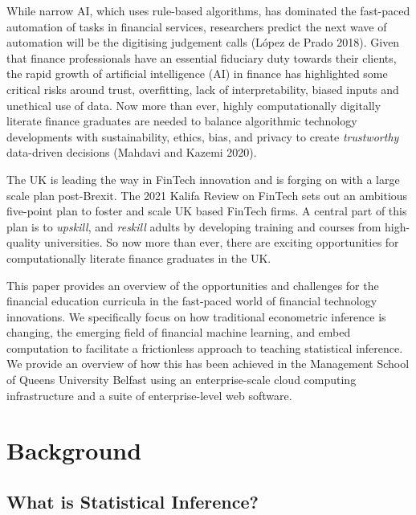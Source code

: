 \documentclass{article}
\begin{document}
While narrow AI, which uses rule-based algorithms, has dominated the
fast-paced automation of tasks in financial services, researchers
predict the next wave of automation will be the digitising judgement
calls (López de Prado 2018). Given that finance professionals have an
essential fiduciary duty towards their clients, the rapid growth of
artificial intelligence (AI) in finance has highlighted some critical
risks around trust, overfitting, lack of interpretability, biased inputs
and unethical use of data. Now more than ever, highly computationally
digitally literate finance graduates are needed to balance algorithmic
technology developments with sustainability, ethics, bias, and privacy
to create \emph{trustworthy} data-driven decisions (Mahdavi and Kazemi
2020).

The UK is leading the way in FinTech innovation and is forging on with a
large scale plan post-Brexit. The 2021 Kalifa Review on FinTech sets out
an ambitious five-point plan to foster and scale UK based FinTech firms.
A central part of this plan is to \emph{upskill}, and \emph{reskill}
adults by developing training and courses from high-quality
universities. So now more than ever, there are exciting opportunities
for computationally literate finance graduates in the UK.

This paper provides an overview of the opportunities and challenges for
the financial education curricula in the fast-paced world of financial
technology innovations. We specifically focus on how traditional
econometric inference is changing, the emerging field of financial
machine learning, and embed computation to facilitate a frictionless
approach to teaching statistical inference. We provide an overview of
how this has been achieved in the Management School of Queens University
Belfast using an enterprise-scale cloud computing infrastructure and a
suite of enterprise-level web software.

\hypertarget{background}{%
\section{Background}\label{background}}

\hypertarget{what-is-statistical-inference}{%
\subsection{What is Statistical
Inference?}\label{what-is-statistical-inference}}
\end{document}
